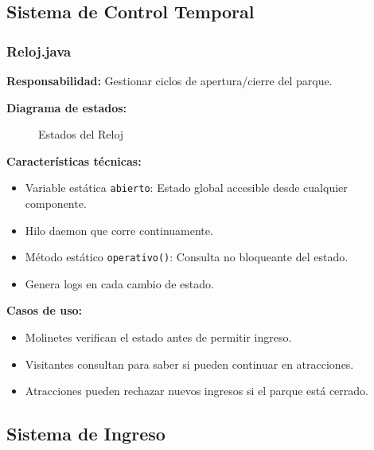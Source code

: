 \documentclass[12pt,a4paper]{article}
\begin{document}
\subsection{Sistema de Control Temporal}

\subsubsection{Reloj.java}

\textbf{Responsabilidad:} Gestionar ciclos de apertura/cierre del parque.

\textbf{Diagrama de estados:}

\begin{figure}[H]
\centering
{}
\caption{Estados del Reloj}
\end{figure}

\textbf{Características técnicas:}
\begin{itemize}
    \item Variable estática \texttt{abierto}: Estado global accesible desde cualquier componente.
    \item Hilo daemon que corre continuamente.
    \item Método estático \texttt{operativo()}: Consulta no bloqueante del estado.
    \item Genera logs en cada cambio de estado.
\end{itemize}

\textbf{Casos de uso:}
\begin{itemize}
    \item Molinetes verifican el estado antes de permitir ingreso.
    \item Visitantes consultan para saber si pueden continuar en atracciones.
    \item Atracciones pueden rechazar nuevos ingresos si el parque está cerrado.
\end{itemize}

\newpage

\subsection{Sistema de Ingreso}
\end{document}
